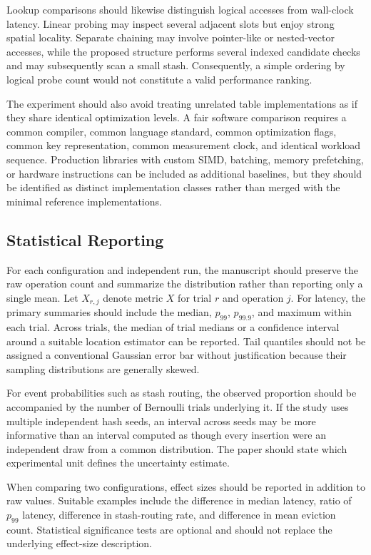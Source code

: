 \documentclass[conference]{IEEEtran}
\begin{document}
Lookup comparisons should likewise distinguish logical accesses from wall-clock
latency. Linear probing may inspect several adjacent slots but enjoy strong
spatial locality. Separate chaining may involve pointer-like or nested-vector
accesses, while the proposed structure performs several indexed candidate checks
and may subsequently scan a small stash. Consequently, a simple ordering by
logical probe count would not constitute a valid performance ranking.

The experiment should also avoid treating unrelated table implementations as
if they share identical optimization levels. A fair software comparison requires
a common compiler, common language standard, common optimization flags, common
key representation, common measurement clock, and identical workload sequence.
Production libraries with custom SIMD, batching, memory prefetching, or hardware
instructions can be included as additional baselines, but they should be
identified as distinct implementation classes rather than merged with the
minimal reference implementations.

\subsection{Statistical Reporting}

For each configuration and independent run, the manuscript should preserve the
raw operation count and summarize the distribution rather than reporting only a
single mean. Let $X_{r,j}$ denote metric $X$ for trial $r$ and operation $j$.
For latency, the primary summaries should include the median, $p_{99}$,
$p_{99.9}$, and maximum within each trial. Across trials, the median of trial
medians or a confidence interval around a suitable location estimator can be
reported. Tail quantiles should not be assigned a conventional Gaussian error
bar without justification because their sampling distributions are generally
skewed.

For event probabilities such as stash routing, the observed proportion should
be accompanied by the number of Bernoulli trials underlying it. If the study
uses multiple independent hash seeds, an interval across seeds may be more
informative than an interval computed as though every insertion were an
independent draw from a common distribution. The paper should state which
experimental unit defines the uncertainty estimate.

When comparing two configurations, effect sizes should be reported in addition
to raw values. Suitable examples include the difference in median latency,
ratio of $p_{99}$ latency, difference in stash-routing rate, and difference in
mean eviction count. Statistical significance tests are optional and should not
replace the underlying effect-size description.
\end{document}
